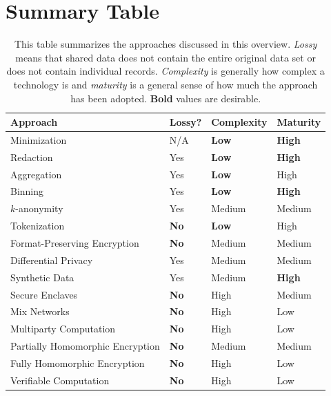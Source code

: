 \documentclass[nobib]{tufte-handout}
\begin{document}
\section{Summary Table}

\begin{table}[ht]
  \centering
  \selectfont
  \begin{tabular}{llll}
    \toprule
    Approach & Lossy? & Complexity & Maturity \\
    \midrule
    Minimization & N/A & \textbf{Low} & \textbf{High} \\
    Redaction & Yes & \textbf{Low} & \textbf{High} \\
    Aggregation & Yes & \textbf{Low} & High  \\
    Binning & Yes & \textbf{Low} & \textbf{High} \\
    $k$-anonymity & Yes & Medium & Medium  \\
    Tokenization & \textbf{No} & \textbf{Low} & High  \\
    Format-Preserving Encryption & \textbf{No} & Medium & Medium \\
    Differential Privacy & Yes & Medium & Medium \\
    Synthetic Data & Yes & Medium & \textbf{High} \\
    Secure Enclaves & \textbf{No} & High & Medium \\
    Mix Networks & \textbf{No} & High & Low \\
    Multiparty Computation & \textbf{No} & High & Low \\
    Partially Homomorphic Encryption & \textbf{No} & Medium & Medium \\
    Fully Homomorphic Encryption & \textbf{No} & High & Low \\
    Verifiable Computation & \textbf{No} & High & Low \\
    \bottomrule
  \end{tabular}
  \caption{This table summarizes the approaches discussed in this overview.
  \textit{Lossy} means that shared data does not contain the entire original
  data set or does not contain individual records. \textit{Complexity} is
  generally how complex a technology is and \textit{maturity} is a general
  sense of how much the approach has been adopted. \textbf{Bold} values are
  desirable. }
  \label{tab:normaltab}
\end{table}

 
\end{document}
